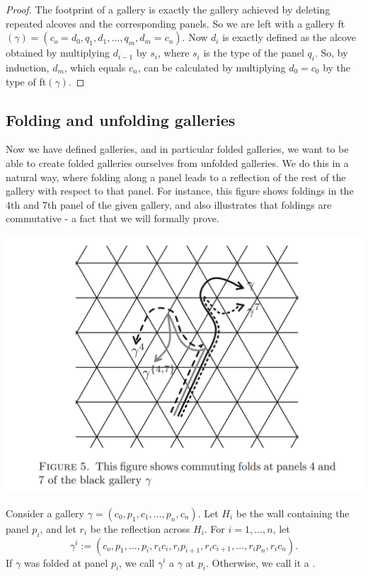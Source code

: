 \documentclass[11pt]{article}
\begin{document}
\begin{proof}
    The footprint of a gallery is exactly the gallery achieved by deleting repeated alcoves and the corresponding panels. So we are left with a gallery ft$(\gamma)=(c_o=d_0,q_1,d_1,\hdots ,q_m,d_m=c_n)$. Now $d_i$ is exactly defined as the alcove obtained by multiplying $d_{i-1}$ by $s_i$, where $s_i$ is the type of the panel $q_i$. So, by induction, $d_m$, which equals $c_n$, can be calculated by multiplying $d_0=c_0$ by the type of ft$(\gamma)$. 
\end{proof}

\subsection{Folding and unfolding galleries}

Now we have defined galleries, and in particular folded galleries, we want to be able to create folded galleries ourselves from unfolded galleries. We do this in a natural way, where folding along a panel leads to a reflection of the rest of the gallery with respect to that panel. For instance, this figure shows foldings in the 4th and 7th panel of the given gallery, and also illustrates that foldings are commutative - a fact that we will formally prove.
\begin{center}
\includegraphics[scale=0.4]{Screenshot 2023-02-03 153412.png}\\
\end{center}

\begin{definition}
    Consider a gallery $\gamma = (c_0,p_1,c_1,\hdots ,p_n,c_n)$. Let $H_i$ be the wall containing the panel $p_i$, and let $r_i$ be the reflection across $H_i$. For $i=1,\hdots ,n$, let
    \[\gamma^i:=(c_o,p_1,\hdots ,p_i,r_ic_i,r_ip_{i+1},r_ic_{i+1},\hdots ,r_ip_n,r_ic_n).\]
    If $\gamma$ was folded at panel $p_i$, we call $\gamma^i$ a $\gamma$ at $p_i$. Otherwise, we call it a .
\end{definition}
\end{document}
